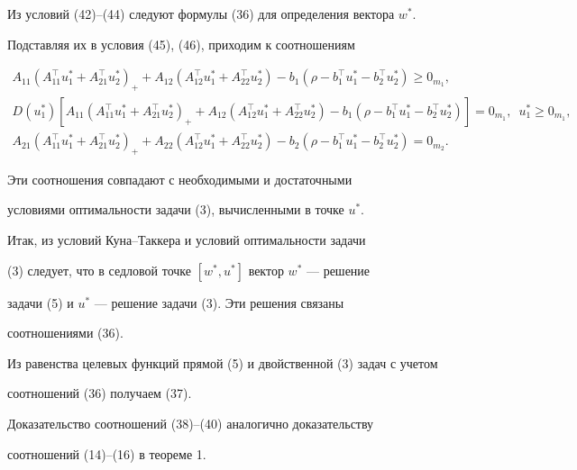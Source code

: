 \begin{pf}
Из условий (42)--(44) следуют формулы (36) для определения вектора $w^*$.


Подставляя их в условия (45), (46), приходим к соотношениям


\begin{gather*}


A_{11}(A^\top_{11}u^*_1+A^\top_{21}u^*_2)_++A_{12}


(A^\top_{12}u^*_1+A^\top_{22}u^*_2)-b_1(\rho-b^\top_1u^*_1-


b^\top_2u^*_2)\ge0_{m_1},\\


%


D(u^*_1)[A_{11}(A^\top_{11}u^*_1+A^\top_{21}u^*_2)_++


A_{12}(A^\top_{12}u^*_1+A^\top_{22}u^*_2)-


b_1(\rho-b^\top_1u^*_1-b^\top_2u^*_2)]=0_{m_1},


\ \; u^*_1\ge0_{m_1}, \\


%


A_{21}(A^\top_{11}u^*_1+A^\top_{21}u^*_2)_++A_{22}


(A^\top_{12}u^*_1+A^\top_{22}u^*_2)-


b_2(\rho-b^\top_1u^*_1-b^\top_2u^*_2)=0_{m_2}.


\end{gather*}


Эти соотношения совпадают с необходимыми и достаточными


условиями оптимальности задачи (3), вычисленными в точке $u^*$.


Итак, из условий Куна--Таккера и условий оптимальности задачи


(3) следует, что в седловой точке $[w^*,u^*]$ вектор $w^*$ --- решение


задачи (5) и $u^*$ --- решение задачи (3). Эти решения связаны


соотношениями (36).





Из равенства целевых функций прямой (5) и двойственной (3) задач с учетом


соотношений (36) получаем (37).





Доказательство соотношений (38)--(40) аналогично доказательству


соотношений (14)--(16) в теореме 1.






\end{pf}
